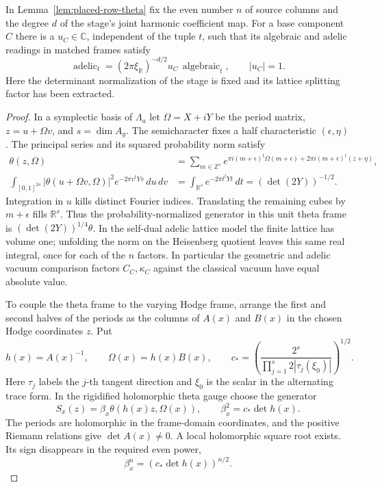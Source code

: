 \begin{auxlemma}
\label{lem:placed-row-tuple-phase}
In Lemma~\ref{lem:placed-row-theta} fix the even number \(n\)
of source columns and the degree \(d\) of the stage's joint
harmonic coefficient map. For a base component \(C\) there is
a \(u_C\in\mathbb C\), independent of the tuple \(t\), such that
its algebraic and adelic readings in matched frames satisfy
\[
 \operatorname{adelic}_t
   =(2\pi\xi_{\mathbb R})^{-d/2}u_C\,
     \operatorname{algebraic}_t,\qquad |u_C|=1 .
\]
Here the determinant normalization of the stage is fixed and
its lattice splitting factor has been extracted.
\end{auxlemma}
\begin{proof}
In a symplectic basis of \(\Lambda_a\) let
\(\Omega=X+iY\) be the period matrix,
\(z=u+\Omega v\), and \(s=\dim A_g\). The semicharacter fixes
a half characteristic \((\epsilon,\eta)\). The principal
series and its squared probability norm satisfy
\begin{align*}
 \theta(z,\Omega)&=\sum_{m\in\mathbb Z^s}
 e^{\pi i(m+\epsilon)^t\Omega(m+\epsilon)+
                 2\pi i(m+\epsilon)^t(z+\eta)},\\
 \int_{[0,1]^{2s}}|\theta(u+\Omega v,\Omega)|^2
     e^{-2\pi v^tYv}\,du\,dv
 &=\int_{\mathbb R^s}e^{-2\pi t^tYt}\,dt
    =(\det(2Y))^{-1/2}.
\end{align*}
Integration in \(u\) kills distinct Fourier indices. Translating
the remaining cubes by \(m+\epsilon\) fills \(\mathbb R^s\).
Thus the probability-normalized generator in this unit theta
frame is \((\det(2Y))^{1/4}\theta\). In the self-dual adelic
lattice model the finite lattice has volume one; unfolding the
norm on the Heisenberg quotient leaves this same real integral,
once for each of the \(n\) factors. In particular the geometric
and adelic vacuum comparison factors \(C_C,\kappa_C\) against
the classical vacuum have equal absolute value.

To couple the theta frame to the varying Hodge frame, arrange
the first and second halves of the periods as the columns of
\(A(x)\) and \(B(x)\) in the chosen Hodge coordinates \(z\). Put
\[
 h(x)=A(x)^{-1},\qquad \Omega(x)=h(x)B(x),\qquad
 c_*=\left(\frac{2^s}{\prod_{j=1}^s2|\tau_j(\xi_0)|}\right)^{1/2}.
\]
Here \(\tau_j\) labels the \(j\)-th tangent direction and
\(\xi_0\) is the scalar in the alternating trace form.
In the rigidified holomorphic theta gauge choose the generator
\[
       S_x(z)=\beta_x\theta(h(x)z,\Omega(x)),\qquad
       \beta_x^2=c_*\det h(x).
\]
The periods are holomorphic in the frame-domain coordinates,
and the positive Riemann relations give \(\det A(x)\ne0\).
A local holomorphic square root exists. Its sign disappears in
the required even power,
\[
       \beta_x^n=(c_*\det h(x))^{n/2}.
\]


\end{proof}
